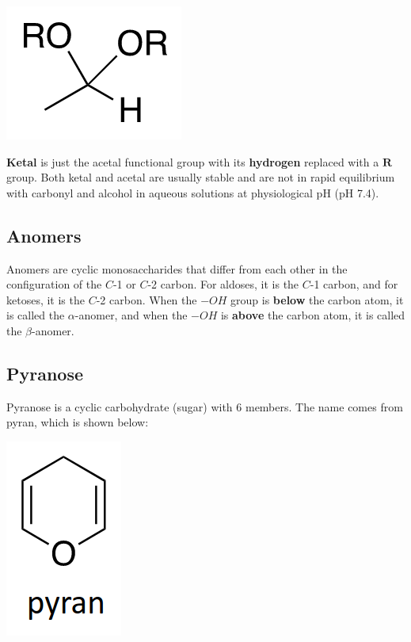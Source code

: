 \documentclass[11pt]{article}
\begin{document}
\begin{center}
\includegraphics[scale=1.0]{./images/acetal.png}
\end{center}

\textbf{Ketal} is just the acetal functional group with its \textbf{hydrogen} replaced with a \(\boldsymbol{R}\) group. Both ketal and acetal are usually stable and are not in rapid equilibrium with carbonyl and alcohol in aqueous solutions at physiological pH (pH 7.4).
\subsection{Anomers}
\label{sec:org269ff01}
Anomers are cyclic monosaccharides that differ from each other in the configuration of the \(C\)-1 or \(C\)-2 carbon. For aldoses, it is the \(C\)-1 carbon, and for ketoses, it is the \(C\)-2 carbon. When the \(-OH\) group is \textbf{below} the carbon atom, it is called the \(\alpha\)-anomer, and when the \(-OH\) is \textbf{above} the carbon atom, it is called the \(\beta\)-anomer.
\subsection{Pyranose}
\label{sec:org2815b24}
Pyranose is a cyclic carbohydrate (sugar) with 6 members. The name comes from pyran, which is shown below:

\begin{center}
\includegraphics[scale=1.0]{./images/pyran.png}
\end{center}
\end{document}
